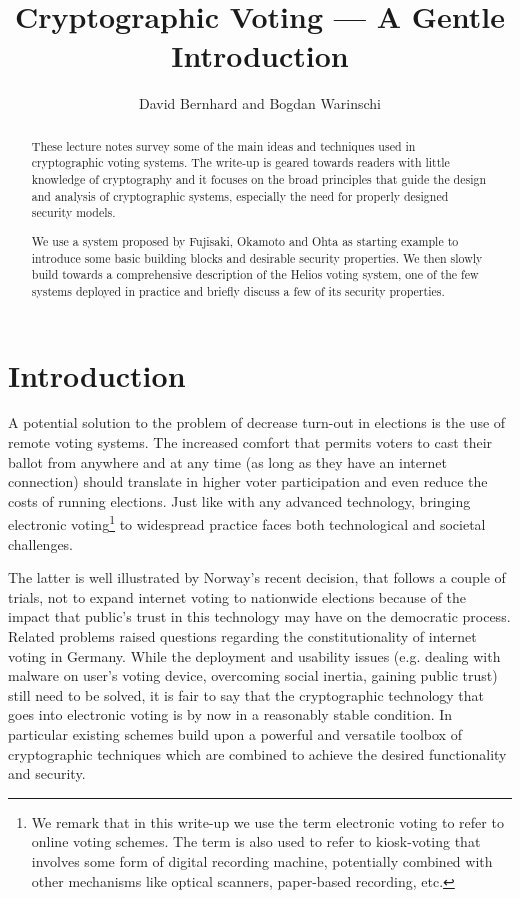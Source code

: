 \documentclass[envcountsame]{llncs}
\title{Cryptographic Voting --- A Gentle Introduction}
\author{David Bernhard and Bogdan Warinschi}
\institute{University of Bristol, England}
\begin{document}
\maketitle

\begin{abstract}
These lecture notes survey some of the main ideas and techniques used in cryptographic voting systems. 
The write-up is geared towards readers with little knowledge of cryptography and it focuses on the broad principles that guide the design and analysis of cryptographic systems, especially the need for properly designed security models.

We use a system proposed by Fujisaki, Okamoto and Ohta as starting example to introduce some basic building blocks and desirable security properties.  We then slowly build towards a comprehensive description of the Helios voting system, one of the few systems deployed in practice and briefly discuss a few of its security properties. 
\end{abstract}

\section{Introduction}
A potential solution to the problem of decrease turn-out in elections is the use of remote voting systems.  The increased comfort that permits voters to cast their ballot from anywhere and at any time (as long as they have an internet connection) should translate in higher voter participation and even reduce the costs of running elections.  
Just like with any advanced technology, bringing electronic voting\footnote{We remark that in this write-up we use the term electronic voting to refer to online voting schemes. The term is also used to refer to kiosk-voting that involves some form of digital recording machine, potentially combined with other mechanisms like optical scanners, paper-based recording, etc. } to widespread practice faces both technological and societal challenges. 

The latter is well illustrated by Norway's recent decision, that follows a couple of trials, not to expand internet voting to nationwide elections because of the impact that public's trust in this technology may have on the democratic process.  Related problems raised questions regarding the constitutionality of internet voting in Germany.   
While the deployment and usability issues (e.g. dealing with malware on user's voting device, overcoming social inertia, gaining public trust) still need to be solved, it is fair to say that the cryptographic technology that goes into electronic voting is by now in a reasonably stable condition. In particular existing schemes build upon a powerful and versatile toolbox of cryptographic techniques which are combined to achieve the desired functionality and security.
\end{document}
